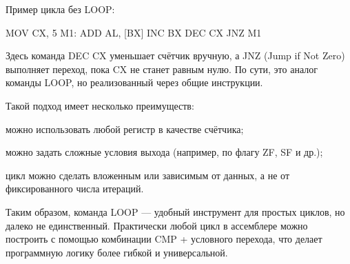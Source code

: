 Пример цикла без LOOP:

MOV CX, 5
M1:  ADD AL, [BX]
     INC BX
     DEC CX
     JNZ M1

Здесь команда DEC CX уменьшает счётчик вручную, а JNZ (Jump if Not Zero) выполняет переход, пока CX не станет равным нулю. По сути, это аналог команды LOOP, но реализованный через общие инструкции.

Такой подход имеет несколько преимуществ:

можно использовать любой регистр в качестве счётчика;

можно задать сложные условия выхода (например, по флагу ZF, SF и др.);

цикл можно сделать вложенным или зависимым от данных, а не от фиксированного числа итераций.

Таким образом, команда LOOP — удобный инструмент для простых циклов, но далеко не единственный. Практически любой цикл в ассемблере можно построить с помощью комбинации CMP + условного перехода, что делает программную логику более гибкой и универсальной.

\endinput
